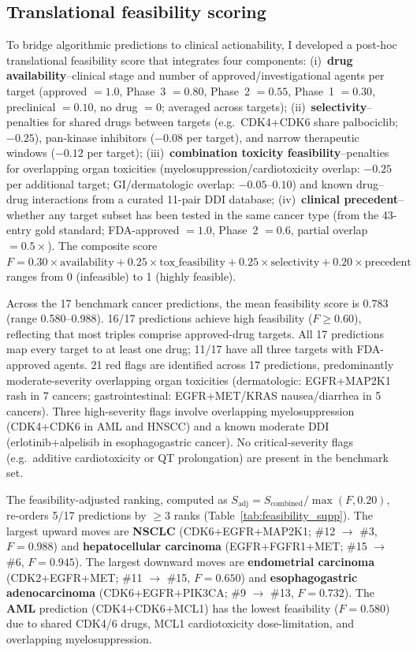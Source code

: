 \documentclass[11pt]{article}
\begin{document}
\subsection{Translational feasibility scoring}
\label{sec:feasibility}
To bridge algorithmic predictions to clinical actionability, I developed a post-hoc translational feasibility score that integrates four components: (i)~\textbf{drug availability}--clinical stage and number of approved/investigational agents per target (approved $= 1.0$, Phase~3 $= 0.80$, Phase~2 $= 0.55$, Phase~1 $= 0.30$, preclinical $= 0.10$, no drug $= 0$; averaged across targets); (ii)~\textbf{selectivity}--penalties for shared drugs between targets (e.g.\ CDK4+CDK6 share palbociclib; $-0.25$), pan-kinase inhibitors ($-0.08$ per target), and narrow therapeutic windows ($-0.12$ per target); (iii)~\textbf{combination toxicity feasibility}--penalties for overlapping organ toxicities (myelosuppression/cardiotoxicity overlap: $-0.25$ per additional target; GI/dermatologic overlap: $-0.05$--$0.10$) and known drug--drug interactions from a curated 11-pair DDI database; (iv)~\textbf{clinical precedent}--whether any target subset has been tested in the same cancer type (from the 43-entry gold standard; FDA-approved $= 1.0$, Phase~2 $= 0.6$, partial overlap $= 0.5\times$). The composite score $F = 0.30 \times \text{availability} + 0.25 \times \text{tox\_feasibility} + 0.25 \times \text{selectivity} + 0.20 \times \text{precedent}$ ranges from 0 (infeasible) to 1 (highly feasible).

Across the 17 benchmark cancer predictions, the mean feasibility score is 0.783 (range 0.580--0.988). 16/17 predictions achieve high feasibility ($F \geq 0.60$), reflecting that most triples comprise approved-drug targets. All 17 predictions map every target to at least one drug; 11/17 have all three targets with FDA-approved agents. 21 red flags are identified across 17 predictions, predominantly moderate-severity overlapping organ toxicities (dermatologic: EGFR+MAP2K1 rash in 7 cancers; gastrointestinal: EGFR+MET/KRAS nausea/diarrhea in 5 cancers). Three high-severity flags involve overlapping myelosuppression (CDK4+CDK6 in AML and HNSCC) and a known moderate DDI (erlotinib+alpelisib in esophagogastric cancer). No critical-severity flags (e.g.\ additive cardiotoxicity or QT prolongation) are present in the benchmark set.

The feasibility-adjusted ranking, computed as $S_{\text{adj}} = S_{\text{combined}} / \max(F, 0.20)$, re-orders 5/17 predictions by $\geq$3 ranks (Table~\ref{tab:feasibility_supp}). The largest upward moves are \textbf{NSCLC} (CDK6+EGFR+MAP2K1; \#12 $\to$ \#3, $F = 0.988$) and \textbf{hepatocellular carcinoma} (EGFR+FGFR1+MET; \#15 $\to$ \#6, $F = 0.945$). The largest downward moves are \textbf{endometrial carcinoma} (CDK2+EGFR+MET; \#11 $\to$ \#15, $F = 0.650$) and \textbf{esophagogastric adenocarcinoma} (CDK6+EGFR+PIK3CA; \#9 $\to$ \#13, $F = 0.732$). The \textbf{AML} prediction (CDK4+CDK6+MCL1) has the lowest feasibility ($F = 0.580$) due to shared CDK4/6 drugs, MCL1 cardiotoxicity dose-limitation, and overlapping myelosuppression.
\end{document}
